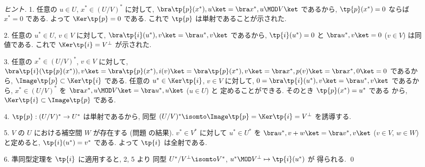 \documentclass[12pt,twoside]{jarticle}
\begin{document}
\begin{proof}[ヒント]
  1. 任意の $u\in U$, $x^*\in (U/V)^*$ に対して, %
  $\bra\tp{p}(x^*),u\ket = \bra x^*,u\MOD V\ket$ であるから, %
  $\tp{p}(x^*)=0$ ならば $x^*=0$ である.
  よって $\Ker\tp{p}=0$ である.
  これで $\tp{p}$ は単射であることが示された.

  2. 任意の $u^*\in U$, $v\in V$ に対して, %
  $\bra \tp{i}(u^*),v\ket = \bra u^*,v\ket$ であるから, %
  $\tp{i}(u^*)=0$ と $\bra u^*,v\ket=0$ ($v\in V$) は同値である.
  これで $\Ker\tp{i}=V^\bot$ が示された.

  3. 任意の $x^*\in(U/V)^*$, $v\in V$ に対して, %
  $\bra\tp{i}(\tp{p}(x^*)),v\ket 
  = \bra\tp{p}(x^*),i(v)\ket
  = \bra\tp{p}(x^*),v\ket
  = \bra x^*,p(v)\ket 
  = \bra x^*,0\ket 
  = 0$ であるから, $\Image\tp{p}\subset\Ker\tp{i}$ である.
  任意の $u^*\in\Ker\tp{i}$, $v\in V$ に対して, %
  $0 = \bra\tp{i}(u^*),v\ket
  = \bra u^*,v\ket$ であるから, $x^*\in(U/V)^*$ を %
  $\bra x^*,u\MOD V\ket = \bra u^*,u\ket$ ($u\in U$) と
  定めることができる. そのとき $\tp{p}(x^*)=u^*$ である
  から, $\Ker\tp{i}\subset\Image\tp{p}$ である.

  4. $\tp{p}:(U/V)^*\to U^*$ は単射であるから, 
  同型 $(U/V)^*\isomto\Image\tp{p}=\Ker\tp{i}=V^\bot$ を誘導する.

  5. $V$ の $U$ における補空間 $W$ が存在する
  (問題  の結果).
  $v^*\in V^*$ に対して $u^*\in U^*$ を $\bra u^*,v+w\ket=\bra v^*,v\ket$
  ($v\in V$, $w\in W$) と定めると, $\tp{i}(u^*)=v^*$ である.
  よって $\tp{i}$ は全射である.

  6. 準同型定理を $\tp{i}$ に適用すると, 2, 5 より
  同型 $U^*/V^\bot\isomto V^*$, $u^*\MOD V^\bot \mapsto \tp{i}(u^*)$ が
  得られる.
  \qed
\end{proof}







\end{document}
